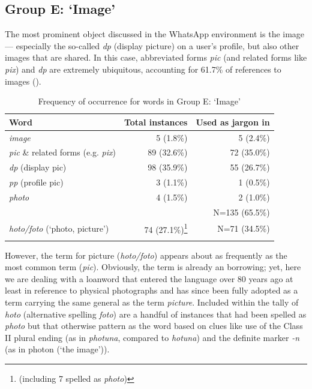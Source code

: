 \documentclass[output=paper,newtxmath,modfonts,nonflat,hidelinks]{langsci/langscibook}
\begin{document}
\subsection{Group E: ‘Image’}

The most prominent object discussed in the WhatsApp environment is the image — especially the so-called \textit{dp} (display picture) on a user’s profile, but also other images that are shared. In this case, abbreviated  forms \textit{pic} (and related forms like \textit{pix}) and \textit{dp} are extremely ubiquitous, accounting for 61.7\% of references to images ().

\begin{table}
\begin{tabularx}{\textwidth}{Qrr}
\lsptoprule
 Word & Total instances &  Used as jargon in \\
\midrule
\textit{image}                                    & 5 (1.8\%)   & 5 (2.4\%)\\
\textit{pic} \& related forms (e.g. \textit{pix}) & 89 (32.6\%) & 72 (35.0\%)\\
\textit{dp} (display pic)                         & 98 (35.9\%) & 55 (26.7\%)\\
\textit{pp} (profile pic)                         & 3 (1.1\%)   & 1 (0.5\%)\\
\textit{photo}                                    & 4 (1.5\%)   & 2 (1.0\%)\\\midrule
& & N=135 (65.5\%)\\\midrule
\textit{hoto/foto}  (‘photo, picture’) & 74 (27.1\%)\footnote{(including 7 spelled as \textit{photo})} & N=71 (34.5\%)\\
\lspbottomrule
\end{tabularx}
\caption{Frequency of occurrence for words in Group E: ‘Image’}
\label{tab:purvis:7}
\end{table} 

However, the  term for picture (\textit{hoto/foto}) appears about as frequently as the most common  term (\textit{pic}). Obviously, the  term is already an  borrowing; yet, here we are dealing with a loanword that entered the  language over 80 years ago at least \citep{bargery1934} in reference to physical photographs and has since been fully adopted as a  term carrying the same general  as the  term \textit{picture}. Included within the tally of  \textit{hoto} (alternative spelling \textit{foto}) are a handful of instances that had been spelled as \textit{photo} but that otherwise pattern as the  word based on clues like use of the Class II plural ending (as in \textit{photuna}, compared to \textit{hotuna}) and the definite marker \textit{{}-n} (as in photon (‘the image’)).
\end{document}
